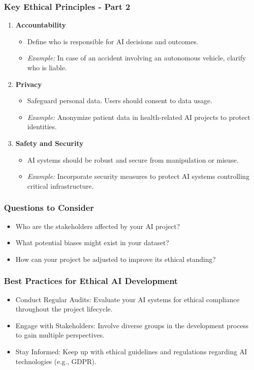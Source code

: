 \documentclass[aspectratio=169]{beamer}
\begin{document}
\begin{frame}[fragile]
    \frametitle{Key Ethical Principles - Part 2}
    \begin{enumerate}[resume]
        \item \textbf{Accountability}
            \begin{itemize}
                \item Define who is responsible for AI decisions and outcomes.
                \item \textit{Example:} In case of an accident involving an autonomous vehicle, clarify who is liable.
            \end{itemize}

        \item \textbf{Privacy}
            \begin{itemize}
                \item Safeguard personal data. Users should consent to data usage.
                \item \textit{Example:} Anonymize patient data in health-related AI projects to protect identities.
            \end{itemize}

        \item \textbf{Safety and Security}
            \begin{itemize}
                \item AI systems should be robust and secure from manipulation or misuse.
                \item \textit{Example:} Incorporate security measures to protect AI systems controlling critical infrastructure.
            \end{itemize}
    \end{enumerate}
\end{frame}

\begin{frame}[fragile]
    \frametitle{Questions to Consider}
    \begin{itemize}
        \item Who are the stakeholders affected by your AI project?
        \item What potential biases might exist in your dataset?
        \item How can your project be adjusted to improve its ethical standing?
    \end{itemize}
\end{frame}

\begin{frame}[fragile]
    \frametitle{Best Practices for Ethical AI Development}
    \begin{itemize}
        \item Conduct Regular Audits: Evaluate your AI systems for ethical compliance throughout the project lifecycle.
        \item Engage with Stakeholders: Involve diverse groups in the development process to gain multiple perspectives.
        \item Stay Informed: Keep up with ethical guidelines and regulations regarding AI technologies (e.g., GDPR).
    \end{itemize}
\end{frame}
\end{document}
